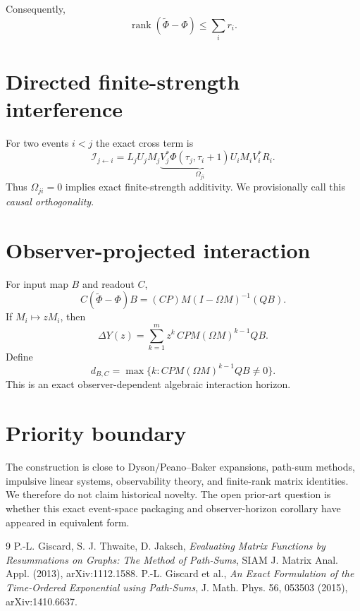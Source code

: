 \documentclass[11pt]{article}
\begin{document}
Consequently,
\[
\operatorname{rank}(\widetilde\Phi-\Phi)\le\sum_i r_i.
\]

\section{Directed finite-strength interference}
For two events $i<j$ the exact cross term is
\[
\mathcal I_{j\leftarrow i}
=
L_jU_jM_j
\underbrace{V_j^*\Phi(\tau_j,\tau_i+1)U_i}_{\Omega_{ji}}
M_iV_i^*R_i.
\]
Thus $\Omega_{ji}=0$ implies exact finite-strength additivity. We provisionally call this \emph{causal orthogonality}.

\section{Observer-projected interaction}
For input map $B$ and readout $C$,
\[
C(\widetilde\Phi-\Phi)B=(CP)M(I-\Omega M)^{-1}(QB).
\]
If $M_i\mapsto zM_i$, then
\[
\Delta Y(z)=\sum_{k=1}^m z^k\,CPM(\Omega M)^{k-1}QB.
\]
Define
\[
d_{B,C}=\max\{k:CPM(\Omega M)^{k-1}QB\neq0\}.
\]
This is an exact observer-dependent algebraic interaction horizon.

\section{Priority boundary}
The construction is close to Dyson/Peano--Baker expansions, path-sum methods, impulsive linear systems, observability theory, and finite-rank matrix identities. We therefore do not claim historical novelty. The open prior-art question is whether this exact event-space packaging and observer-horizon corollary have appeared in equivalent form.

\begin{thebibliography}{9}
 P.-L. Giscard, S. J. Thwaite, D. Jaksch, \emph{Evaluating Matrix Functions by Resummations on Graphs: The Method of Path-Sums}, SIAM J. Matrix Anal. Appl. (2013), arXiv:1112.1588.
 P.-L. Giscard et al., \emph{An Exact Formulation of the Time-Ordered Exponential using Path-Sums}, J. Math. Phys. 56, 053503 (2015), arXiv:1410.6637.
\end{thebibliography}
\end{document}
